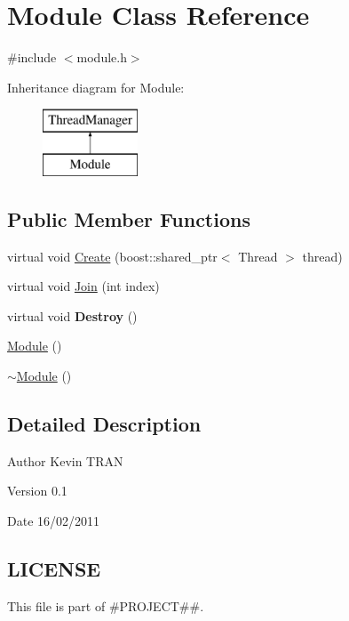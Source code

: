 \hypertarget{classModule}{
\section{Module Class Reference}
\label{d3/d9c/classModule}
}


{\ttfamily \#include $<$module.h$>$}

Inheritance diagram for Module:\begin{figure}[H]
\begin{center}
\leavevmode
\includegraphics[height=2cm]{d3/d9c/classModule}
\end{center}
\end{figure}
\subsection*{Public Member Functions}
\begin{DoxyCompactItemize}
\item 
virtual void \hyperlink{classModule_a9984bf9d8b1ea6e280c8c47cdb56e906}{Create} (boost::shared\_\-ptr$<$ Thread $>$ thread)
\item 
virtual void \hyperlink{classModule_ac141815618543512136b7f4e0c90d311}{Join} (int index)
\item 
\hypertarget{classModule_abf23e90e0daac13fec1c7617c2e3ad2d}{
virtual void {\bfseries Destroy} ()}
\label{d3/d9c/classModule_abf23e90e0daac13fec1c7617c2e3ad2d}

\item 
\hyperlink{classModule_a5a240a8a9ab1813b17bcb810b24ceaea}{Module} ()
\item 
\hyperlink{classModule_a7c9d9c096786d127590fdd8aa2b7d681}{$\sim$Module} ()
\end{DoxyCompactItemize}


\subsection{Detailed Description}
\begin{DoxyAuthor}{Author}
Kevin TRAN 
\end{DoxyAuthor}
\begin{DoxyVersion}{Version}
0.1 
\end{DoxyVersion}
\begin{DoxyDate}{Date}
16/02/2011 
\end{DoxyDate}
\hypertarget{d6/d40/classThread_3_01TM_01_4_LICENSE}{}\subsection{LICENSE}\label{d6/d40/classThread_3_01TM_01_4_LICENSE}
This file is part of \#PROJECT\#\#.

